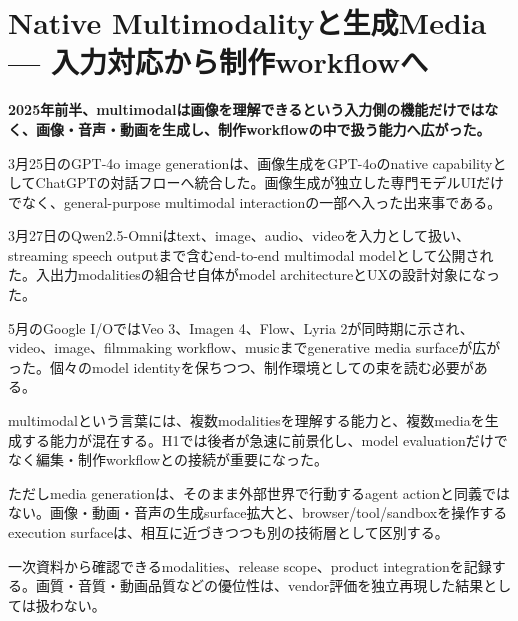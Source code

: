 \section{Native Multimodalityと生成Media — 入力対応から制作workflowへ}
\label{pkg:multimodal}
\noindent\textbf{2025年前半、multimodalは画像を理解できるという入力側の機能だけではなく、画像・音声・動画を生成し、制作workflowの中で扱う能力へ広がった。}\autocite{src-877e7da88408,src-de4ffd746276,src-e68f8ce96685}

3月25日のGPT-4o image generationは、画像生成をGPT-4oのnative capabilityとしてChatGPTの対話フローへ統合した。画像生成が独立した専門モデルUIだけでなく、general-purpose multimodal interactionの一部へ入った出来事である。\autocite{src-877e7da88408}


3月27日のQwen2.5-Omniはtext、image、audio、videoを入力として扱い、streaming speech outputまで含むend-to-end multimodal modelとして公開された。入出力modalitiesの組合せ自体がmodel architectureとUXの設計対象になった。\autocite{src-de4ffd746276}


5月のGoogle I/OではVeo 3、Imagen 4、Flow、Lyria 2が同時期に示され、video、image、filmmaking workflow、musicまでgenerative media surfaceが広がった。個々のmodel identityを保ちつつ、制作環境としての束を読む必要がある。\autocite{src-e68f8ce96685}


multimodalという言葉には、複数modalitiesを理解する能力と、複数mediaを生成する能力が混在する。H1では後者が急速に前景化し、model evaluationだけでなく編集・制作workflowとの接続が重要になった。\autocite{src-877e7da88408,src-de4ffd746276,src-e68f8ce96685}


ただしmedia generationは、そのまま外部世界で行動するagent actionと同義ではない。画像・動画・音声の生成surface拡大と、browser/tool/sandboxを操作するexecution surfaceは、相互に近づきつつも別の技術層として区別する。\autocite{src-877e7da88408,src-e68f8ce96685}


\begin{claimboundary}
一次資料から確認できるmodalities、release scope、product integrationを記録する。画質・音質・動画品質などの優位性は、vendor評価を独立再現した結果としては扱わない。
\end{claimboundary}

